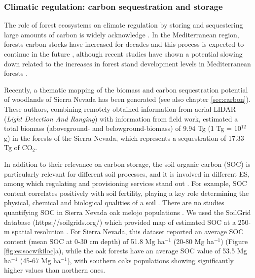 \subsubsection{Climatic regulation: carbon sequestration and storage}\label{sec:es:regulation-carbon}

The role of forest ecosystems on climate regulation by storing and sequestering large amounts of carbon is widely acknowledge \autocites{Gauquelinetal2018MediterraneanForests,NoceSantini2018MediterraneanForest}. In the Mediterranean region, forests carbon stocks have increased for decades and this process is expected to continue in the future \autocites{Canellasetal2017CarbonSequestration}, although recent studies have shown a potential slowing down related to the increases in forest stand development levels in Mediterranean forests \autocite{RocesDiazetal2021TemporalChanges}. 

Recently, a thematic mapping of the biomass and carbon sequestration potential of woodlands of Sierra Nevada has been generated \autocites{PerezLuqueetal2021CarbonSequestration} (see also chapter \ref{sec:carbon}). These authors, combining remotely obtained information from aerial LIDAR (\emph{Light Detection And Ranging}) with information from field work, estimated a total biomass (aboveground- and belowground-biomass) of 9.94 Tg (1 Tg = 10$^{12}$ g) in the forests of the Sierra Nevada, which represents a sequestration of 17.33 Tg of CO$_2$.  

In addition to their relevance on carbon storage, the soil organic carbon (SOC) is particularly relevant for different soil processes, and it is involved in different ES, among which regulating and provisioning services stand out \autocites{Francavigliaetal2018OrganicCarbon}. For example, SOC content correlates positively with soil fertility, playing a key role determining the physical, chemical and biological qualities of a soil \autocites{Victoriaetal2012BenefitsSoil}. There are no studies quantifying SOC in Sierra Nevada oak melojo populations \autocites[but see][for puntual estimation]{CoboDiazetal2017TaxonomicFunctional}. We used the SoilGrid database (https://soilgrids.org/) which provided map of estimated SOC at a 250-m spatial resolution \autocites{Hengletal2017SoilGrids250mGlobal,Batjesetal2017WoSISProviding,Batjesetal2020StandardisedSoil}. For Sierra Nevada, this dataset reported an average SOC content (mean SOC at 0-30 cm depth) of 51.8 Mg ha$^{-1}$ (20-80 Mg ha$^{-1}$) (Figure \ref{fig:es:socwikiloc}a), while the oak forests have an average SOC value of 53.5 Mg ha$^{-1}$ (45-67 Mg ha$^{-1}$), with southern oaks populations showing significantly higher values than northern ones.

